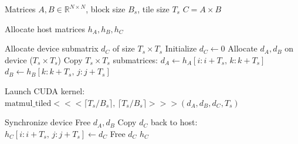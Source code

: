 \begin{algorithm}[H]
\caption{Tiled Matrix Multiplication using CUDA with Host-Level Tiling}
\label{alg:cuda_matmul}
\begin{algorithmic}[1]
\Require Matrices $A, B \in \mathbb{R}^{N \times N}$, block size $B_s$, tile size $T_s$
\Ensure $C = A \times B$

\State Allocate host matrices $h_A, h_B, h_C$

        \State Allocate device submatrix $d_C$ of size $T_s \times T_s$
        \State Initialize $d_C \gets 0$
            \State Allocate $d_A, d_B$ on device ($T_s \times T_s$)
            \State Copy $T_s \times T_s$ submatrices:
            \State \hspace{1em} $d_A \gets h_A[i : i+T_s,\, k : k+T_s]$
            \State \hspace{1em} $d_B \gets h_B[k : k+T_s,\, j : j+T_s]$
            
            \State Launch CUDA kernel:
            \State \hspace{1em} $\text{matmul\_tiled}<<< \lceil T_s/B_s \rceil,\, \lceil T_s/B_s \rceil >>>(d_A, d_B, d_C, T_s)$
            
            \State Synchronize device
            \State Free $d_A, d_B$
        \EndFor
        \State Copy $d_C$ back to host:
        \State \hspace{1em} $h_C[i : i+T_s,\, j : j+T_s] \gets d_C$
        \State Free $d_C$
    \EndFor
\EndFor
\State \Return $h_C$
\end{algorithmic}
\end{algorithm}



